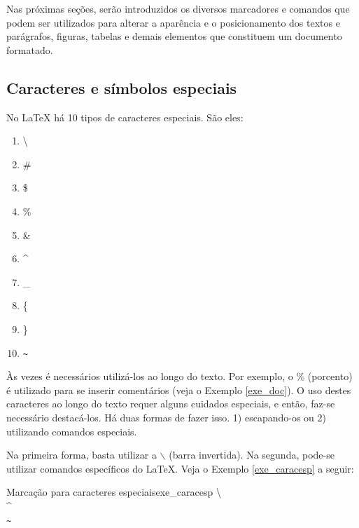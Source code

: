 Nas próximas seções, serão introduzidos os diversos marcadores e comandos que podem ser utilizados para alterar a aparência e o posicionamento dos textos e parágrafos, figuras, tabelas e demais elementos que constituem um documento formatado.

\subsection{Caracteres e símbolos especiais}
\label{sec:carac_especiais}

No \LaTeX{} há 10 tipos de caracteres especiais. São eles:

\begingroup
\renewcommand{\labelenumi}{\arabic{enumi})}
\begin{multicols}{5}
    \begin{enumerate}
        \item \textbackslash
        \item \#
        \item \$
        \item \%
        \item \&
        \item \^{}
        \item \_
        \item \{
        \item \}
        \item \texttt{\~{}}
    \end{enumerate}
\end{multicols}
\endgroup

Às vezes é necessários utilizá-los ao longo do texto. Por exemplo, o \% (porcento) é utilizado para se inserir comentários (veja o Exemplo \ref{exe_doc}). O uso destes caracteres ao longo do texto requer alguns cuidados especiais, e então, faz-se necessário destacá-los. Há duas formas de fazer isso. 1) escapando-os ou 2) utilizando comandos especiais.

Na primeira forma, basta utilizar a {\tt $\backslash$} (barra invertida). Na segunda, pode-se utilizar comandos específicos do \LaTeX{}. Veja o Exemplo \ref{exe_caracesp} a seguir:

\begin{texexptitled}[breakable,center lower,enhanced,middle=2mm,listing side text]{Marcação para caracteres especiais}{exe_caracesp}
\textbackslash
\\
\^{}
\\
\texttt{\~{}}
\end{texexptitled}

